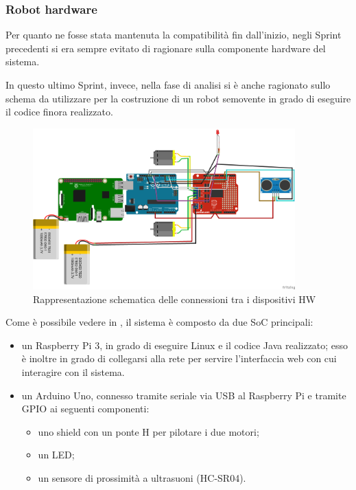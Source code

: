 \subsubsection{Robot hardware}

Per quanto ne fosse stata mantenuta la compatibilità fin dall'inizio, negli Sprint precedenti si era sempre evitato di ragionare sulla componente hardware del sistema.

In questo ultimo Sprint, invece, nella fase di analisi si è anche ragionato sullo schema da utilizzare per la costruzione di un robot semovente in grado di eseguire il codice finora realizzato.

\begin{figure}[H]
  \centering
  \includegraphics[width=0.9\textwidth]{res/sprint4/NanoBotArduino.png}%
  \caption{Rappresentazione schematica delle connessioni tra i dispositivi HW}%
  \label{fig:sp4:nanobot}
\end{figure}

Come è possibile vedere in , il sistema è composto da due SoC principali:

\begin{itemize}
  \item
    un Raspberry Pi 3, in grado di eseguire Linux e il codice Java realizzato;
    esso è inoltre in grado di collegarsi alla rete per servire l'interfaccia web con cui interagire con il sistema.
  \item
    un Arduino Uno, connesso tramite seriale via USB al Raspberry Pi e tramite GPIO ai seguenti componenti:
    \begin{itemize}
      \item uno shield con un ponte H per pilotare i due motori;
      \item un LED\@;
      \item un sensore di prossimità a ultrasuoni (HC-SR04).
    \end{itemize}
\end{itemize}

